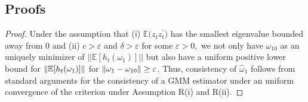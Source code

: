 \documentclass[11pt, letterpaper, twoside]{article}
\begin{document}
\begin{appendices}

\section{Proofs}\label{sec:proofs}


\begin{proof}

    Under the assumption that (i) $ \mathbb{E(}z_{t}z_{t}^{\prime })$ has the smallest eigenvalue bounded away from 0 and (ii) $c>\varepsilon $ and $\delta >\varepsilon $ for some $ \varepsilon >0,$ we not only have $\omega _{10}$ as an uniquely minimizer of $||\mathbb{E}[h_{t}(\omega _{1})]||$ but also have a uniform positive lower bound for $\lVert\operatorname{\mathbb{E}}[h_{t}(\omega _{1})]\rVert$ for $\lVert\omega _{1}-\omega _{10}\rVert \geq \varepsilon$. Thus, consistency of $\widehat{\omega }_{1}$ follows from standard arguments for the consistency of a GMM estimator under an uniform convergence of the criterion under Assumption R(i) and R(ii).


\end{proof}
\end{appendices}
\end{document}
